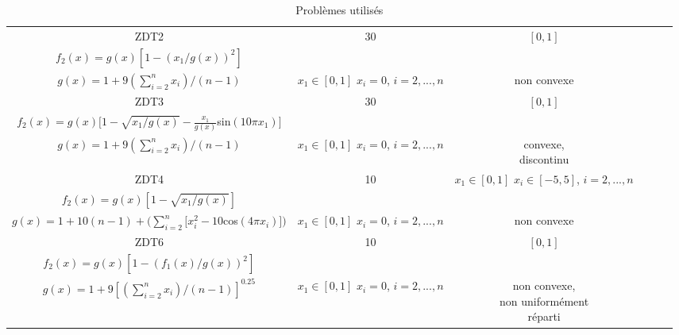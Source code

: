 \documentclass[12pt, letterpaper]{article}
\newcommand{\fncell}[3][]{\makecell[l]{#1 \\ #2 \\ #3}}
\begin{document}
\begin{table}[ht]
\begin{adjustbox}{width=1\textwidth}
\begin{tabular}{|c|c|c|c|c|c|}
      \hline
      ZDT2 & 30 & $[0, 1]$ & \fncell[$f_1(x) = x_1$]
                             {$f_2(x) = g(x) [1 - (x_1 / g(x))^2]$}
                             {$g(x) = 1 + 9(\sum_{i = 2}^{n} x_i) / (n - 1)$}
                                                                   & \makecell{$x_1 \in{} [0, 1]$ \\ $x_i = 0$, \\ $i = 2, ..., n$} & non convexe\\
      \hline
      ZDT3 & 30 & $[0, 1]$ & \fncell[$f_1(x) = x_1$]
                             {$f_2(x) = g(x) [1 - \sqrt{x_1 / g(x)} - \frac{x_1}{g(x)}$sin$(10\pi{}x_1)]$}
                             {$g(x) = 1 + 9(\sum_{i = 2}^{n} x_i) / (n - 1)$}
                                                                   & \makecell{$x_1 \in{} [0, 1]$ \\ $x_i = 0$, \\ $i = 2, ..., n$} & \makecell{convexe, \\ discontinu}\\
      \hline
      ZDT4 & 10 & \makecell{$x_1 \in{} [0, 1]$ \\ $x_i \in{} [-5, 5]$, \\ $i = 2, ..., n$}
               & \fncell[$f_1(x) = x_1$]
                 {$f_2(x) = g(x) [1 - \sqrt{x_1 / g(x)}]$}
                 {$g(x) = 1 + 10(n - 1) + (\sum_{i = 2}^{n} [x_i^2 - 10$cos$(4\pi{}x_i)])$}
                     & \makecell{$x_1 \in{} [0, 1]$ \\ $x_i = 0$, \\ $i = 2, ..., n$} & non convexe\\
      \hline
      ZDT6 & 10 & $[0, 1]$ & \fncell[$f_1(x) = 1 - \exp(-4x_1)$sin$^6(6\pi{}x_1)$]
                             {$f_2(x) = g(x) [1 - (f_1(x) / g(x))^2]$}
                             {$g(x) = 1 + 9[(\sum_{i = 2}^{n} x_i) / (n - 1)]^{0.25}$}
                                                                   & \makecell{$x_1 \in{} [0, 1]$ \\ $x_i = 0$, \\ $i = 2, ..., n$} & \makecell{non convexe, \\ non uniformément \\ réparti}\\
      \hline
    \end{tabular}
  \end{adjustbox}
  \caption{Problèmes utilisés} 
\end{table}

\FloatBarrier
\end{document}
